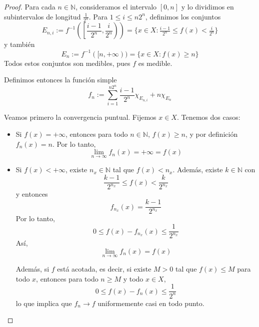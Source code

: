\begin{proof}
    Para cada \(n \in \mathbb{N}\), consideramos el intervalo \([0, n]\) y lo dividimos en subintervalos de longitud \(\frac{1}{2^n}\). Para \(1 \leq i \leq n 2^n\), definimos los conjuntos
    \[
        E_{n,i} := f^{-1}\left(\left[\frac{i-1}{2^n}, \frac{i}{2^n}\right)\right) = \{x \in X : \tfrac{i-1}{2^n} \leq f(x) < \tfrac{i}{2^n}\}
    \]
    y también
    \[
        E_n := f^{-1}([n, +\infty)) = \{x \in X : f(x) \geq n \}
    \]
    Todos estos conjuntos son medibles, pues \(f\) es medible.

    Definimos entonces la función simple
    \[
        f_n := \sum_{i=1}^{n 2^n} \frac{i-1}{2^n} \chi_{E_{n,i}} + n \chi_{E_n}
    \]

    Veamos primero la convergencia puntual. Fijemos \(x \in X\). Tenemos dos casos:
    \begin{itemize}
        \item Si \(f(x) = +\infty\), entonces para todo \(n \in \mathbb{N}\), \(f(x) \geq
              n\), y por definición \(f_n(x) = n\). Por lo tanto,
              \[
                  \lim_{n \to \infty} f_n(x) = +\infty = f(x)
              \]
        \item Si \(f(x) < +\infty\), existe \(n_x \in \mathbb{N}\) tal que \(f(x) < n_x\).
              Además, existe \(k \in \mathbb{N}\) con
              \[
                  \frac{k-1}{2^{n_x}} \leq f(x) < \frac{k}{2^{n_x}}
              \]
              y entonces
              \[
                  f_{n_x}(x) = \frac{k-1}{2^{n_x}}
              \]
              Por lo tanto,
              \[
                  0 \leq f(x) - f_{n_x}(x) \leq \frac{1}{2^{n_x}}
              \]
              Así,
              \[
                  \lim_{n \to \infty} f_n(x) = f(x)
              \]

              Además, si \(f\) está acotada, es decir, si existe \(M > 0\) tal que \(f(x)
              \leq M\) para todo \(x\), entonces para todo \(n \geq M\) y todo \(x \in X\),
              \[
                  0 \leq f(x) - f_n(x) \leq \frac{1}{2^n}
              \]
              lo que implica que \(f_n \to f\) uniformemente casi en todo punto.
    \end{itemize}


\end{proof}

